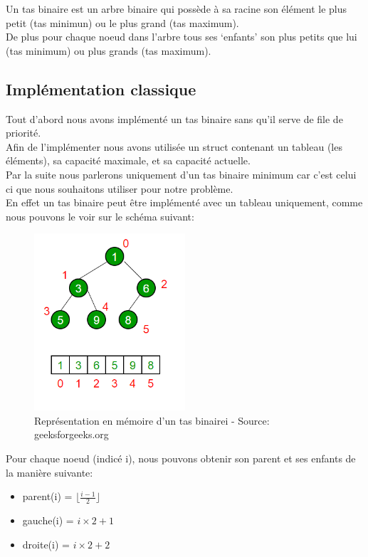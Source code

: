 \documentclass{article}
\begin{document}
Un tas binaire est un arbre binaire qui possède à sa racine son élément le plus petit (tas minimun) ou
le plus grand (tas maximum).\\
De plus pour chaque noeud dans l'arbre tous ses `enfants' son plus petits que lui (tas minimum) ou
plus grands (tas maximum).


\subsection{Implémentation classique}

Tout d'abord nous avons implémenté un tas binaire sans qu'il serve de file de priorité.\\
Afin de l'implémenter nous avons utilisée un struct contenant un tableau (les éléments),
sa capacité maximale, et sa capacité actuelle.\\
Par la suite nous parlerons uniquement d'un tas binaire minimum car c'est celui ci que 
nous souhaitons utiliser pour notre problème.\\

En effet un tas binaire peut être implémenté avec un tableau uniquement, comme nous
pouvons le voir sur le schéma suivant:

\begin{figure}[!hbt]
		\centering
		\includegraphics[width=0.5\textwidth]{binaryheap.png}
		\caption{Représentation en mémoire d'un tas binairei - Source: geeksforgeeks.org}
		\label{vs_3}
\end{figure}

Pour chaque noeud (indicé i), nous pouvons obtenir son parent et ses enfants
de la manière suivante:
\begin{itemize}
	\item parent(i)  = $\lfloor \frac{i-1}{2}  \rfloor$
	\item gauche(i) = $i \times 2 + 1$
	\item droite(i) = $i \times 2 + 2 $\\ 
\end{itemize}
\end{document}

